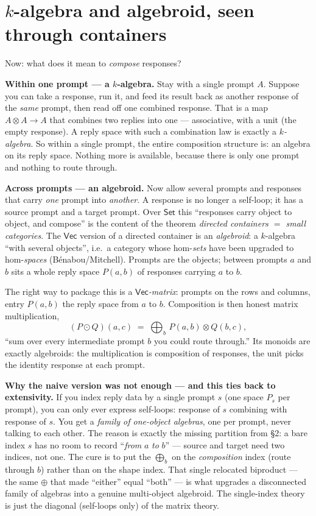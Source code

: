 \documentclass[11pt]{article}
\providecommand{\Vec}{}\renewcommand{\Vec}{\mathsf{Vec}}
\newcommand{\Set}{\mathsf{Set}}
\begin{document}
\section{$k$-algebra and algebroid, seen through containers}

Now: what does it mean to \emph{compose} responses?

\textbf{Within one prompt --- a $k$-algebra.} Stay with a single prompt $A$. Suppose you can
take a response, run it, and feed its result back as another response of the \emph{same}
prompt, then read off one combined response. That is a map $A\otimes A\to A$ that combines
two replies into one --- associative, with a unit (the empty response). A reply space with
such a combination law is exactly a \emph{$k$-algebra}. So within a single prompt, the
entire composition structure is: an algebra on its reply space. Nothing more is available,
because there is only one prompt and nothing to route through.

\textbf{Across prompts --- an algebroid.} Now allow several prompts and responses that carry
\emph{one} prompt into \emph{another}. A response is no longer a self-loop; it has a source
prompt and a target prompt. Over $\Set$ this ``responses carry object to object, and
compose'' is the content of the theorem \emph{directed containers $=$ small categories}.
The $\Vec$ version of a directed container is an \emph{algebroid}: a $k$-algebra ``with
several objects'', i.e.\ a category whose hom-\emph{sets} have been upgraded to
hom-\emph{spaces} (B\'enabou/Mitchell). Prompts are the objects; between prompts $a$ and
$b$ sits a whole reply space $P(a,b)$ of responses carrying $a$ to $b$.

The right way to package this is a \emph{$\Vec$-matrix}: prompts on the rows and columns,
entry $P(a,b)$ the reply space from $a$ to $b$. Composition is then honest matrix
multiplication,
\[
  (P \odot Q)(a,c) \;=\; \bigoplus_{b}\, P(a,b)\otimes Q(b,c),
\]
``sum over every intermediate prompt $b$ you could route through.'' Its monoids are exactly
algebroids: the multiplication is composition of responses, the unit picks the identity
response at each prompt.

\textbf{Why the naive version was not enough --- and this ties back to extensivity.} If you
index reply data by a single prompt $s$ (one space $P_s$ per prompt), you can only ever
express self-loops: response of $s$ combining with response of $s$. You get a \emph{family
of one-object algebras}, one per prompt, never talking to each other. The reason is exactly
the missing partition from \S2: a bare index $s$ has no room to record ``\emph{from} $a$
\emph{to} $b$'' --- source and target need two indices, not one. The cure is to put the
$\bigoplus_b$ on the \emph{composition} index (route through $b$) rather than on the shape
index. That single relocated biproduct --- the same $\oplus$ that made ``either'' equal
``both'' --- is what upgrades a disconnected family of algebras into a genuine multi-object
algebroid. The single-index theory is just the diagonal (self-loops only) of the matrix
theory.
\end{document}
